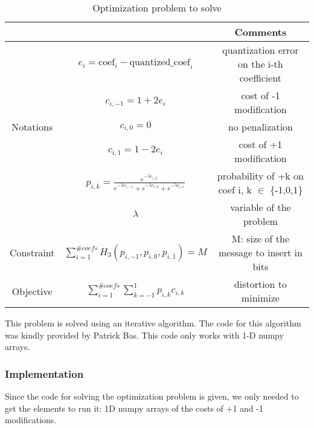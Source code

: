 \documentclass[12pt]{article}
\begin{document}
\begin{table}[H]
\begin{tabular}{ |c|c|c| }
    \hline
    &  & Comments\\
    \hline
    & $e_i = \text{coef}_i - \text{quantized\_coef}_i$ & quantization error on the i-th coefficient\\ 
    & $c_{i,-1} = 1 + 2e_i$ & cost of -1 modification\\ 
    Notations & $c_{i,0} = 0$ & no penalization\\
    & $c_{i,1} = 1 - 2e_i$ & cost of +1 modification\\
    & $p_{i,k} = \frac{e^{-\lambda c_{i,k}}}{e^{-\lambda c_{i,-1}} + e^{-\lambda c_{i,0}} + e^{-\lambda c_{i,1}}}$ & probability of +k on coef i, k $\in$ \{-1,0,1\}\\
    & $\lambda$ & variable of the problem\\
    \hline
    Constraint & $\displaystyle\sum_{i=1}^{\# coefs}{H_3(p_{i,-1},p_{i,0},p_{i,1})} = M$ & M: size of the message to insert in bits\\
    \hline
    Objective & $\displaystyle\sum_{i=1}^{\# coefs}{\sum_{k=-1}^{1}{p_{i,k}c_{i,k}}}$ & distortion to minimize \\ 
    \hline
\end{tabular}
\caption[Side information]{Optimization problem to solve}
\end{table}

This problem is solved using an iterative algorithm. The code for this algorithm was kindly provided by Patrick Bas. This code only works with 1-D numpy arrays.

\subsubsection{Implementation}
Since the code for solving the optimization problem is given, we only needed to get the elements to run it: 1D numpy arrays of the costs of +1 and -1 modifications.
\end{document}
